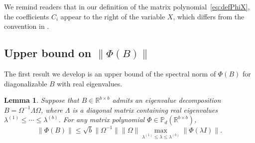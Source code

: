 \documentclass{article}
\newtheorem{lemma}{Lemma}%
\newcommand{\poly}{\mathbb{P}}
\newcommand{\R}{\mathbb{R}}
\providecommand{\norm}[1]{\lVert#1\rVert}
\begin{document}
We remind readers that in our definition of the matrix polynomial~\cref{eq:defPhiX}, the coefficients $C_{i}$ appear to the right of the variable $X$, which differs from the convention in \cite{Dennis1976}.

\subsection{Upper bound on $\norm{\Phi(B)}$}
The first result we develop is an upper bound of the spectral norm of $\Phi(B)$ for diagonalizable $B$ with real eigenvalues.
\begin{lemma}
    \label{lem:boundMP}
    Suppose that $B\in\R^{b\times b}$ admits an eigenvalue decomposition $B = \Omega^{-1} \Lambda \Omega$, where $\Lambda$ is a diagonal matrix containing real eigenvalues $\lambda^{(1)}\leq \dotsb \leq \lambda^{(b)}$. For any matrix polynomial $\Phi\in\poly_{d}(\R^{b\times b})$, 
    \begin{equation*}
        \norm{\Phi(B)}\leq \sqrt{b}\norm{\Omega^{-1}}\norm{\Omega}\max_{\lambda^{(1)}\leq \lambda \leq \lambda^{(b)}}\norm{\Phi(\lambda I)}.
    \end{equation*}
\end{lemma}
\end{document}
